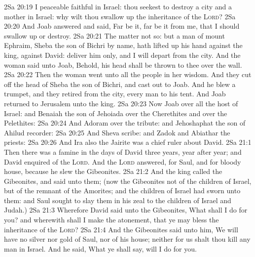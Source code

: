 \vs 2Sa 20:19 I  peaceable  faithful in Israel: thou seekest to destroy a city and a mother in Israel: why wilt thou swallow up the inheritance of the \textsc{Lord}?
\vs 2Sa 20:20 And Joab answered and said, Far be it, far be it from me, that I should swallow up or destroy.
\vs 2Sa 20:21 The matter  not so: but a man of mount Ephraim, Sheba the son of Bichri by name, hath lifted up his hand against the king,  against David: deliver him only, and I will depart from the city. And the woman said unto Joab, Behold, his head shall be thrown to thee over the wall.
\vs 2Sa 20:22 Then the woman went unto all the people in her wisdom. And they cut off the head of Sheba the son of Bichri, and cast  out to Joab. And he blew a trumpet, and they retired from the city, every man to his tent. And Joab returned to Jerusalem unto the king.
\vs 2Sa 20:23 Now Joab  over all the host of Israel: and Benaiah the son of Jehoiada  over the Cherethites and over the Pelethites:
\vs 2Sa 20:24 And Adoram  over the tribute: and Jehoshaphat the son of Ahilud  recorder:
\vs 2Sa 20:25 And Sheva  scribe: and Zadok and Abiathar  the priests:
\vs 2Sa 20:26 And Ira also the Jairite was a chief ruler about David.
\vs 2Sa 21:1 Then there was a famine in the days of David three years, year after year; and David enquired of the \textsc{Lord}. And the \textsc{Lord} answered,  for Saul, and for  bloody house, because he slew the Gibeonites.
\vs 2Sa 21:2 And the king called the Gibeonites, and said unto them; (now the Gibeonites  not of the children of Israel, but of the remnant of the Amorites; and the children of Israel had sworn unto them: and Saul sought to slay them in his zeal to the children of Israel and Judah.)
\vs 2Sa 21:3 Wherefore David said unto the Gibeonites, What shall I do for you? and wherewith shall I make the atonement, that ye may bless the inheritance of the \textsc{Lord}?
\vs 2Sa 21:4 And the Gibeonites said unto him, We will have no silver nor gold of Saul, nor of his house; neither for us shalt thou kill any man in Israel. And he said, What ye shall say,  will I do for you.
